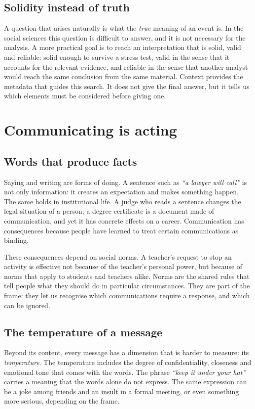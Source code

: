 \subsection{Solidity instead of truth}
A question that arises naturally is what the \emph{true} meaning of an event is. In the social sciences this question is difficult to answer, and it is not necessary for the analysis. A more practical goal is to reach an interpretation that is solid, valid and reliable: solid enough to survive a stress test, valid in the sense that it accounts for the relevant evidence, and reliable in the sense that another analyst would reach the same conclusion from the same material. Context provides the metadata that guides this search. It does not give the final answer, but it tells us which elements must be considered before giving one.

\section{Communicating is acting}

\subsection{Words that produce facts}
Saying and writing are forms of doing. A sentence such as \emph{``a lawyer will call''} is not only information: it creates an expectation and makes something happen. The same holds in institutional life. A judge who reads a sentence changes the legal situation of a person; a degree certificate is a document made of communication, and yet it has concrete effects on a career. Communication has consequences because people have learned to treat certain communications as binding.

These consequences depend on social norms. A teacher's request to stop an activity is effective not because of the teacher's personal power, but because of norms that apply to students and teachers alike. Norms are the shared rules that tell people what they should do in particular circumstances. They are part of the frame: they let us recognise which communications require a response, and which can be ignored.

\subsection{The temperature of a message}
Beyond its content, every message has a dimension that is harder to measure: its \emph{temperature}. The temperature includes the degree of confidentiality, closeness and emotional tone that comes with the words. The phrase \emph{``keep it under your hat''} carries a meaning that the words alone do not express. The same expression can be a joke among friends and an insult in a formal meeting, or even something more serious, depending on the frame.

